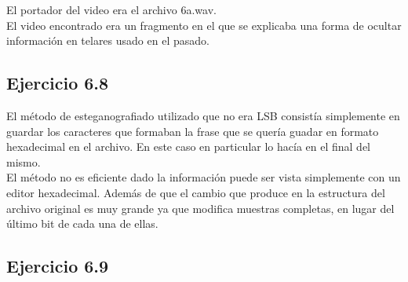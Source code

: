 \documentclass{article}
\begin{document}
\noindent El portador del video era el archivo 6a.wav. \\ El video encontrado era un fragmento en el que se explicaba una forma de ocultar información en telares usado en el pasado.

\subsection{Ejercicio 6.8}

\noindent El método de esteganografiado utilizado que no era LSB consistía simplemente en guardar los caracteres que formaban la frase que se quería guadar en formato hexadecimal en el archivo. En este caso en particular lo hacía en el final del mismo.\\
El método no es eficiente dado la información puede ser vista simplemente con un editor hexadecimal. Además de que el cambio que produce en la estructura del archivo original es muy grande ya que modifica muestras completas, en lugar del último bit de cada una de ellas.\\

\subsection{Ejercicio 6.9}
\end{document}
